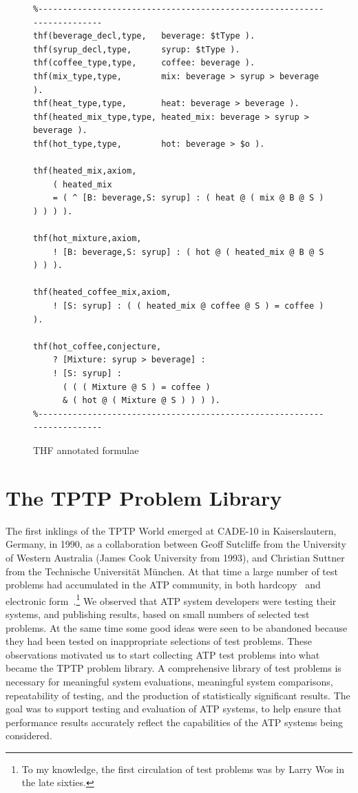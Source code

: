 \documentclass[runningheads]{llncs}
\begin{document}
\begin{figure}[htb]
\centering
{\footnotesize
{\setlength{\baselineskip}{3mm}
\begin{verbatim}
%------------------------------------------------------------------------
thf(beverage_decl,type,   beverage: $tType ).
thf(syrup_decl,type,      syrup: $tType ).
thf(coffee_type,type,     coffee: beverage ).
thf(mix_type,type,        mix: beverage > syrup > beverage ).
thf(heat_type,type,       heat: beverage > beverage ).
thf(heated_mix_type,type, heated_mix: beverage > syrup > beverage ).
thf(hot_type,type,        hot: beverage > $o ).

thf(heated_mix,axiom,
    ( heated_mix
    = ( ^ [B: beverage,S: syrup] : ( heat @ ( mix @ B @ S ) ) ) ) ).

thf(hot_mixture,axiom,
    ! [B: beverage,S: syrup] : ( hot @ ( heated_mix @ B @ S ) ) ).

thf(heated_coffee_mix,axiom,
    ! [S: syrup] : ( ( heated_mix @ coffee @ S ) = coffee ) ).

thf(hot_coffee,conjecture,
    ? [Mixture: syrup > beverage] :
    ! [S: syrup] :
      ( ( ( Mixture @ S ) = coffee )
      & ( hot @ ( Mixture @ S ) ) ) ).
%------------------------------------------------------------------------
\end{verbatim}
}}
\caption{THF annotated formulae}
\label{ExampleFormulae}
\end{figure}

\section{The TPTP Problem Library}
\label{TPTP}

The first inklings of the TPTP World emerged at CADE-10 in Kaiserslautern, Germany, in 1990, as 
a collaboration between Geoff Sutcliffe from the University of Western Australia (James Cook 
University from 1993), and Christian Suttner from the Technische Universit{\"a}t M{\"u}nchen.
At that time a large number of test problems had accumulated in the ATP community, in both 
hardcopy~\cite{MOW76,WM76,Pel86-JAR,BL+86,Qua92-JAR,MW92-CADE-11} and electronic 
form~\cite{ANL,SPRFN}.\footnote{To my knowledge, the first circulation of test problems was by 
Larry Wos in the late sixties.} 
We observed that ATP system developers were testing their systems, and publishing results, 
based on small numbers of selected test problems.
At the same time some good ideas were seen to be abandoned because they had been tested on
inappropriate selections of test problems.
These observations motivated us to start collecting ATP test problems into what became the TPTP 
problem library.
A comprehensive library of test problems is necessary for meaningful system evaluations, 
meaningful system comparisons, repeatability of testing, and the production of statistically 
significant results. 
The goal was to support testing and evaluation of ATP systems, to help ensure that performance 
results accurately reflect the capabilities of the ATP systems being considered. 
\end{document}
